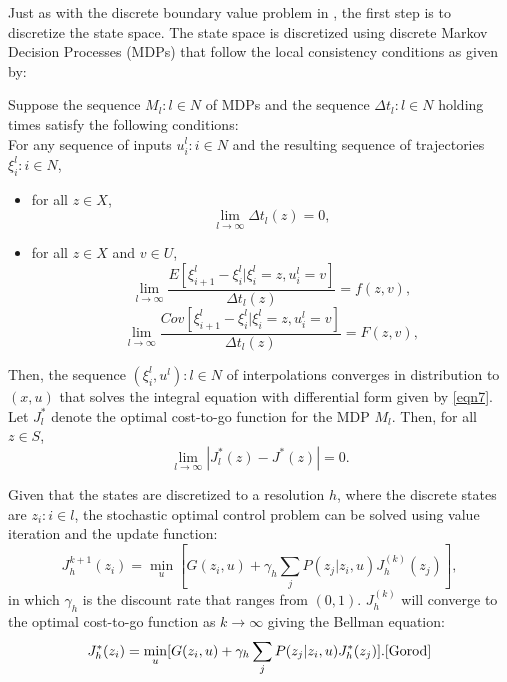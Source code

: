 Just as with the discrete boundary value problem in \cite{bardi2}, the first step is to discretize the state space. The state space is discretized using discrete Markov Decision Processes (MDPs) that follow the local consistency conditions as given by:
\begin{theorem}
Suppose the sequence ${M_l:l \in N}$ of MDPs and the sequence ${\Delta t_l:l \in N}$ holding times satisfy the following conditions:\\
For any sequence of inputs ${u_i^l:i \in N}$ and the resulting sequence of trajectories ${\xi_i^l: i \in N}$,
\begin{itemize}
\item for all $z \in X$, 
\begin{equation*}
\lim\limits_{l \rightarrow \infty} \Delta t_l(z) = 0,
\end{equation*}
\item for all $ z \in X$ and $v \in U$,
\begin{equation*}
\lim\limits_{l \rightarrow \infty} \dfrac{E[\xi_{i+1}^l-\xi_i^l|\xi_i^l =z,u_i^l = v]}{\Delta t_l(z)} = f(z,v),
\end{equation*}
\begin{equation*}
\lim\limits_{l \rightarrow \infty} \dfrac{Cov[\xi_{i+1}^l-\xi_i^l|\xi_i^l =z,u_i^l = v]}{\Delta t_l(z)} = F(z,v),
\end{equation*}
\end{itemize}
Then, the sequence ${(\xi_i^l,u^l):l \in N}$ of interpolations converges in distribution to $(x,u)$ that solves the integral equation with differential form given by \ref{eqn7}. Let $J_l^*$ denote the optimal cost-to-go function for the MDP $M_l$. Then, for all $z \in S$, 
\begin{equation*}
\lim\limits_{l \rightarrow \infty}|J_l^*(z)-J^*(z)| = 0.
\end{equation*}    
\end{theorem}
Given that the states are discretized to a resolution $h$, where the discrete states are ${z_i:i \in l}$, the stochastic optimal control problem can be solved using value iteration and the update function:
\begin{equation}\label{eqn8}
J_h^{k+1}(z_i)= \underset{u }{\operatorname{min }}[G(z_i,u) + \gamma_h \sum_{j}P(z_j|z_i, u)J_h^{(k)}(z_j)],
\end{equation}
in which $\gamma_h$ is the discount rate that ranges from $(0,1)$. $J_h^{(k)}$ will converge to the optimal cost-to-go function as $k \rightarrow \infty$ giving the Bellman equation:
\begin{equation}
J_h^*(z_i) = \underset{u }{\operatorname{min }}[G(z_i,u) + \gamma_h \sum_{j}P(z_j|z_i,u)J_h^*(z_j)].\cite{Gorod}
\end{equation} 
  

